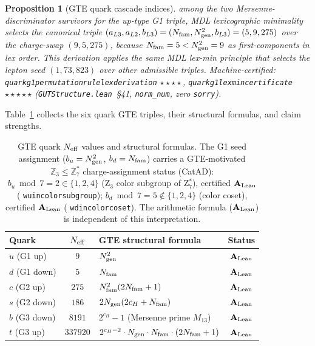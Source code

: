 \documentclass[11pt]{article}
\newtheorem{proposition}[theorem]{Proposition}
\theoremstyle{remark}
\newcommand{\Ngen}{N_{\rm gen}}
\newcommand{\Nfam}{N_{\rm fam}}
\newcommand{\cH}{c_H}
\newcommand{\lean}[1]{%
  \penalty-100
  \begingroup\def\_{\textunderscore\allowbreak}\texttt{#1}\endgroup}
\newcommand{\bu}{b_u}
\newcommand{\bd}{b_d}
\newcommand{\CatAL}{\ensuremath{\textbf{A}_{\rm Lean}}}
\begin{document}
\begin{proposition}[GTE quark cascade indices]
among the two Mersenne-discriminator survivors for the up-type G1 triple, MDL lexicographic minimality selects the canonical triple $(a_{L3}, a_{L2}, b_{L3}) = (N_{\rm fam}, N_{\rm gen}^2, b_{L3}) = (5, 9, 275)$ over the charge-swap $(9, 5, 275)$, because $N_{\rm fam} = 5 < N_{\rm gen}^2 = 9$ as first-components in lex order.
This derivation applies the same MDL lex-min principle that selects the lepton seed $(1,73,823)$ over other admissible triples.
Machine-certified: \lean{quark\_g1\_permutation\_rule\_lex\_derivation} $\boldsymbol{\star\star\star\star}$, \lean{quark\_g1\_lex\_min\_certificate} $\boldsymbol{\star\star\star\star\star}$ (\texttt{GUTStructure.lean}~\S41, \texttt{norm\_num}, zero \texttt{sorry}).
\end{proposition}

Table~\ref{tab:quark_neff} collects the six quark GTE triples, their structural formulas,
and claim strengths.

\begin{table}[H]
\centering
\caption{GTE quark $N_{\rm eff}$ values and structural formulas.
The G1 seed assignment ($\bu=\Ngen^2$, $\bd=\Nfam$) carries a GTE-motivated
$\mathbb{Z}_3\!\leq\!\mathbb{Z}_7^*$ charge-assignment status (CatAD):
$\bu\bmod 7 = 2 \in \{1,2,4\}$ (Z$_3$ color subgroup of Z$_7^*$), certified $\CatAL$
(\lean{w\_u\_in\_color\_subgroup}); $\bd\bmod 7 = 5 \notin \{1,2,4\}$ (color coset),
certified $\CatAL$ (\lean{w\_d\_in\_color\_coset}).
The arithmetic formula ($\CatAL$) is independent of this interpretation.}
\label{tab:quark_neff}
\small
\renewcommand{\arraystretch}{1.2}
\begin{tabular}{lclc}
\toprule
Quark & $N_{\rm eff}$ & GTE structural formula & Status \\
\midrule
$u$ (G1 up)   & $9$      & $\Ngen^2$                                                  & $\CatAL$ \\
$d$ (G1 down) & $5$      & $\Nfam$                                                    & $\CatAL$ \\
$c$ (G2 up)   & $275$    & $\Nfam^2(2\Nfam+1)$                                        & $\CatAL$ \\
$s$ (G2 down) & $186$    & $2\Ngen(2\cH+\Nfam)$                                       & $\CatAL$ \\
$b$ (G3 down) & $8191$   & $2^{\cH}-1$ \quad (Mersenne prime $M_{13}$)                & $\CatAL$ \\
$t$ (G3 up)   & $337920$ & $2^{\cH-2}\cdot\Ngen\cdot\Nfam\cdot(2\Nfam+1)$            & $\CatAL$ \\
\bottomrule
\end{tabular}
\end{table}
\end{document}
